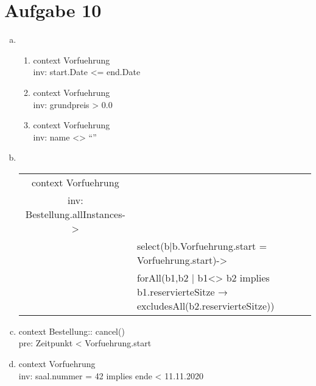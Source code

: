 \section*{Aufgabe 10}
\begin{enumerate} [a)]
	\item \begin{enumerate} [1.]
		\item context Vorfuehrung \\
		inv: start.Date <= end.Date
		\item context Vorfuehrung\\
		inv: grundpreis > 0.0
		\item context Vorfuehrung \\
		inv: name <> “”
	\end{enumerate}
\item \phantom{a}\\
\begin{tabular}{cl}
	context Vorfuehrung&\\
	inv: Bestellung.allInstances->&\\
	&select(b|b.Vorfuehrung.start = Vorfuehrung.start)->\\
	&forAll(b1,b2 | b1<> b2 implies b1.reservierteSitze → excludesAll(b2.reservierteSitze))\\
\end{tabular}
\item context Bestellung:: cancel()\\
pre: Zeitpunkt < Vorfuehrung.start
\item context Vorfuehrung \\
inv: saal.nummer = 42 implies ende < 11.11.2020
\end{enumerate}

